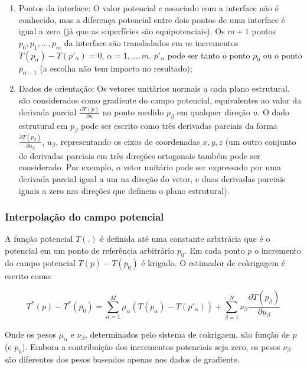 \begin{enumerate}
\item Pontos da interface: O valor potencial $c$ associado com a interface não é conhecido, mas a diferença potencial entre dois pontos de uma interface é igual a zero (já que as superfícies são equipotenciais). Os $m+1$ pontos $p_0, p_1, ..., p_m$ da interface são transladados em $m$ incrementos $T(p_{\alpha})-T(p'_\alpha)=0$, $\alpha=1,...,m$. $p'_\alpha$ pode ser tanto o ponto $p_0$ ou o ponto $p_{\alpha-1}$ (a escolha não tem impacto no resultado);
\item Dados de orientação: Os vetores unitários normais a cada plano estrutural, são considerados como gradiente do campo potencial, equivalentes ao valor da derivada parcial $\frac{\partial T(p)}{\partial u}$ no ponto medido $p_\beta$ em qualquer direção $u$. O dado estrutural em $p_\beta$ pode ser escrito como três derivadas parciais da forma $\frac{\partial T(p_\beta)}{\partial u_\beta}$, $u_\beta$, representando os eixos de coordenadas $x, y, z$ (um outro conjunto de derivadas parciais em três direções ortogonais também pode ser considerado. Por exemplo, o vetor unitário pode ser expressado por uma derivada parcial igual a um na direção do vetor, e duas derivadas parciais iguais a zero nas direções que definem o plano estrutural).    
\end{enumerate}

\subsubsection{Interpolação do campo potencial}

A função potencial $T(.)$ é definida até uma constante arbitrária que é o potencial em um ponto de referência arbitrário $p_0$. Em cada ponto $p$ o incremento do campo potencial $T(p)-T(p_0)$ é krigado. O estimador de cokrigagem é escrito como:

\begin{equation}
	\label{eq_pot_field}
    T^*(p)-T^*(p_0)=\sum\limits_{\alpha=1}^M \mu_\alpha(T(p_\alpha)-T(p'_\alpha))+\sum\limits_{\beta=1}^N \nu_\beta \frac{\partial T(p_\beta)}{\partial u_\beta}
\end{equation}

Onde os pesos $\mu_\alpha$ e $\nu_\beta$, determinados pelo sistema de cokrigaem, são função de $p$ (e $p_0$). Embora a contribuição dos incrementos potenciais seja zero, os pesos $\nu_\beta$ são diferentes dos pesos baseados apenas nos dados de gradiente.

